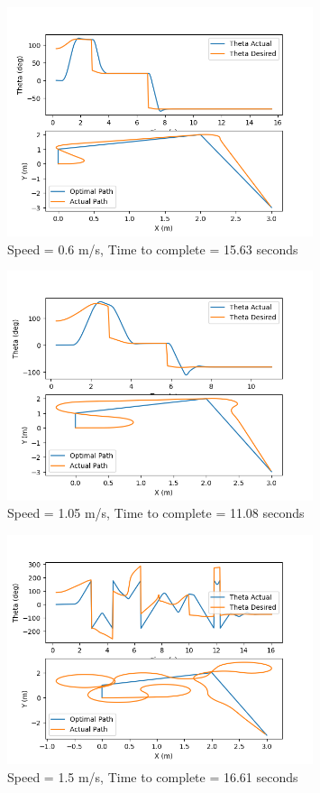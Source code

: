 \documentclass{article}
\begin{document}
\begin{figure}[h]
  \centering
  \includegraphics[width=0.8\textwidth]{question6-0.6ms.png}
  \caption*{Speed = 0.6 m/s, Time to complete = 15.63 seconds }  
\end{figure}

\begin{figure}[h]
  \centering
  \includegraphics[width=0.8\textwidth]{question6-1.05ms.png}
  \caption*{Speed = 1.05 m/s, Time to complete = 11.08 seconds }  
\end{figure}


\begin{figure}[h]
  \centering
  \includegraphics[width=0.8\textwidth]{question6-1.5ms.png}
  \caption*{Speed = 1.5 m/s, Time to complete = 16.61 seconds }  
\end{figure}
\end{document}
